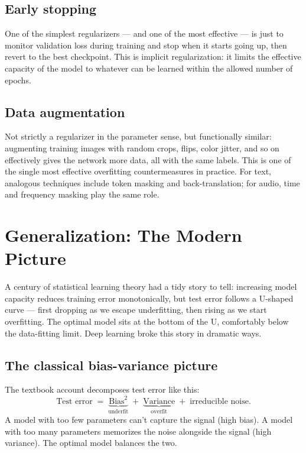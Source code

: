 \documentclass[11pt, a4paper]{article}
\let\oldsection\section
\renewcommand{\section}{\clearpage\oldsection}
\begin{document}
\subsection{Early stopping}

One of the simplest regularizers --- and one of the most effective --- is just to monitor validation loss during training and stop when it starts going up, then revert to the best checkpoint. This is implicit regularization: it limits the effective capacity of the model to whatever can be learned within the allowed number of epochs.

\subsection{Data augmentation}

Not strictly a regularizer in the parameter sense, but functionally similar: augmenting training images with random crops, flips, color jitter, and so on effectively gives the network more data, all with the same labels. This is one of the single most effective overfitting countermeasures in practice. For text, analogous techniques include token masking and back-translation; for audio, time and frequency masking play the same role.

\section{Generalization: The Modern Picture}
\label{sec:generalization}

A century of statistical learning theory had a tidy story to tell: increasing model capacity reduces training error monotonically, but test error follows a U-shaped curve --- first dropping as we escape underfitting, then rising as we start overfitting. The optimal model sits at the bottom of the U, comfortably below the data-fitting limit. Deep learning broke this story in dramatic ways.

\subsection{The classical bias-variance picture}

The textbook account decomposes test error like this:
\begin{equation}
    \text{Test error} \;=\; \underbrace{\text{Bias}^2}_{\text{underfit}} \;+\; \underbrace{\text{Variance}}_{\text{overfit}} \;+\; \text{irreducible noise}.
\end{equation}
A model with too few parameters can't capture the signal (high bias). A model with too many parameters memorizes the noise alongside the signal (high variance). The optimal model balances the two.
\end{document}
